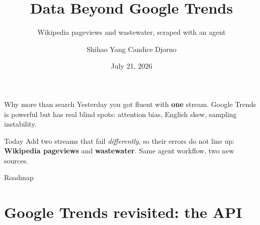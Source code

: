 \documentclass[aspectratio=169,11pt]{beamer}
\title{Data Beyond Google Trends}
\subtitle{Wikipedia pageviews and wastewater, scraped with an agent}
\author{Shihao Yang \quad\textbullet\quad Candice Djorno}
\institute{SISMID 2026 \textbullet\ Day 2, 9:00}
\date{July 21, 2026}
\begin{document}
\begin{frame}
  \titlepage
\end{frame}

\begin{frame}{Why more than search}
  Yesterday you got fluent with \textbf{one} stream. Google Trends is powerful but has real
  blind spots: attention bias, English skew, sampling instability.
  \begin{block}{Today}
    Add two streams that fail \emph{differently}, so their errors do not line up:
    \textbf{Wikipedia pageviews} and \textbf{wastewater}. Same agent workflow, two new
    sources.
  \end{block}
  \vspace{0.3em}
  \begin{center}
  \end{center}
\end{frame}

\begin{frame}{Roadmap}
  \tableofcontents
\end{frame}

\section{Google Trends revisited: the API}
\end{document}
